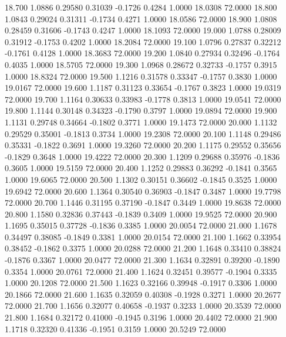   18.700   1.0886   0.29580   0.31039  -0.1726   0.4284   1.0000  18.0308  72.0000
  18.800   1.0843   0.29024   0.31311  -0.1734   0.4271   1.0000  18.0586  72.0000
  18.900   1.0808   0.28459   0.31606  -0.1743   0.4247   1.0000  18.1093  72.0000
  19.000   1.0788   0.28009   0.31912  -0.1753   0.4202   1.0000  18.2084  72.0000
  19.100   1.0796   0.27837   0.32212  -0.1761   0.4128   1.0000  18.3683  72.0000
  19.200   1.0840   0.27934   0.32496  -0.1764   0.4035   1.0000  18.5705  72.0000
  19.300   1.0968   0.28672   0.32733  -0.1757   0.3915   1.0000  18.8324  72.0000
  19.500   1.1216   0.31578   0.33347  -0.1757   0.3830   1.0000  19.0167  72.0000
  19.600   1.1187   0.31123   0.33654  -0.1767   0.3823   1.0000  19.0319  72.0000
  19.700   1.1164   0.30633   0.33983  -0.1778   0.3813   1.0000  19.0541  72.0000
  19.800   1.1144   0.30148   0.34323  -0.1790   0.3797   1.0000  19.0894  72.0000
  19.900   1.1131   0.29748   0.34664  -0.1802   0.3771   1.0000  19.1473  72.0000
  20.000   1.1132   0.29529   0.35001  -0.1813   0.3734   1.0000  19.2308  72.0000
  20.100   1.1148   0.29486   0.35331  -0.1822   0.3691   1.0000  19.3260  72.0000
  20.200   1.1175   0.29552   0.35656  -0.1829   0.3648   1.0000  19.4222  72.0000
  20.300   1.1209   0.29688   0.35976  -0.1836   0.3605   1.0000  19.5159  72.0000
  20.400   1.1252   0.29883   0.36292  -0.1841   0.3565   1.0000  19.6065  72.0000
  20.500   1.1302   0.30151   0.36602  -0.1845   0.3525   1.0000  19.6942  72.0000
  20.600   1.1364   0.30540   0.36903  -0.1847   0.3487   1.0000  19.7798  72.0000
  20.700   1.1446   0.31195   0.37190  -0.1847   0.3449   1.0000  19.8638  72.0000
  20.800   1.1580   0.32836   0.37443  -0.1839   0.3409   1.0000  19.9525  72.0000
  20.900   1.1695   0.35015   0.37728  -0.1836   0.3385   1.0000  20.0054  72.0000
  21.000   1.1678   0.34497   0.38085  -0.1849   0.3381   1.0000  20.0154  72.0000
  21.100   1.1662   0.33954   0.38452  -0.1862   0.3375   1.0000  20.0288  72.0000
  21.200   1.1648   0.33410   0.38824  -0.1876   0.3367   1.0000  20.0477  72.0000
  21.300   1.1634   0.32891   0.39200  -0.1890   0.3354   1.0000  20.0761  72.0000
  21.400   1.1624   0.32451   0.39577  -0.1904   0.3335   1.0000  20.1208  72.0000
  21.500   1.1623   0.32166   0.39948  -0.1917   0.3306   1.0000  20.1866  72.0000
  21.600   1.1635   0.32059   0.40308  -0.1928   0.3271   1.0000  20.2677  72.0000
  21.700   1.1656   0.32077   0.40658  -0.1937   0.3233   1.0000  20.3539  72.0000
  21.800   1.1684   0.32172   0.41000  -0.1945   0.3196   1.0000  20.4402  72.0000
  21.900   1.1718   0.32320   0.41336  -0.1951   0.3159   1.0000  20.5249  72.0000
